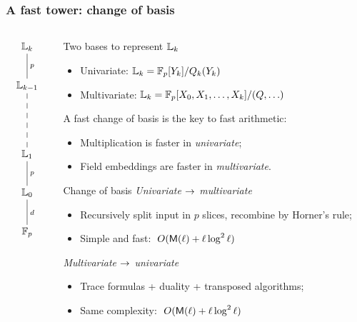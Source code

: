 \documentclass[10pt,usepdftitle=false]{beamer}
\begin{document}
\begin{frame}
  \frametitle{A fast tower: change of basis}

  \vspace{-2mm}

  \begin{columns}
    \begin{column}{0.1\textwidth}
      \Large\[\xymatrix{
        \LK_k \ar@{-}[d]^p\\
        \LK_{k-1} \ar@{--}[dd]\\
        \\
        \LK_1 \ar@{-}[d]^p\\
        \LK_0 \ar@{-}[d]^d\\
        \F_p
      }\]
    \end{column}
    \begin{column}{0.85\textwidth}

      \begin{block}{Two bases to represent $\mathbb{L}_k$}
        \begin{itemize}
        \item Univariate: \hfill\emph{$\mathbb{L}_k=\mathbb{F}_p[Y_k]/Q_k(Y_k)$}\hfill
        \item Multivariate: \hfill\emph{$\mathbb{L}_k=\mathbb{F}_p[X_0,X_1,\ldots,X_k]/(Q,\ldots)$}\hfill
        \end{itemize}
        \alert{A fast change of basis is the key to fast arithmetic:}
        \begin{itemize}
        \item Multiplication is faster in \emph{univariate};
        \item Field embeddings are faster in \emph{multivariate}.
        \end{itemize}
      \end{block}

      \begin{block}{Change of basis}
        \emph{Univariate $\rightarrow$ multivariate}
        \begin{itemize}
        \item Recursively split input in $p$ slices, recombine by
          Horner's rule;
        \item Simple and fast: \emph{$\;O(\mathsf{M}(\ell) + \ell\log^2\ell)$}
        \end{itemize}
        
        \emph{Multivariate $\rightarrow$ univariate}
        \begin{itemize}
        \item Trace formulas + duality + transposed algorithms;
        \item Same complexity: \emph{$\;O(\mathsf{M}(\ell) + \ell\log^2\ell)$}
        \end{itemize}
      \end{block}
    \end{column}
  \end{columns}
\end{frame}
\end{document}
